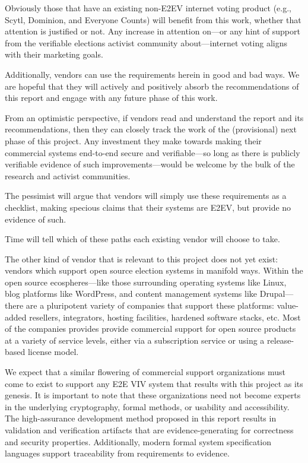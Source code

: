 Obviously those that have an existing non-E2EV internet voting product
(e.g., Scytl, Dominion, and Everyone Counts) will benefit from this
work, whether that attention is justified or not. Any increase in
attention on---or any hint of support from the verifiable elections
activist community about---internet voting aligns with their marketing
goals.

Additionally, vendors can use the requirements herein in good and bad
ways. We are hopeful that they will actively and positively absorb the
recommendations of this report and engage with any future phase of
this work.

From an optimistic perspective, if vendors read and understand the
report and its recommendations, then they can closely track the work
of the (provisional) next phase of this project. Any investment they
make towards making their commercial systems end-to-end secure and
verifiable---so long as there is publicly verifiable evidence of such
improvements---would be welcome by the bulk of the research and
activist communities.

The pessimist will argue that vendors will simply use these
requirements as a checklist, making specious claims that their systems
are E2EV, but provide no evidence of such.

Time will tell which of these paths each existing vendor will choose
to take.

The other kind of vendor that is relevant to this project does not yet
exist: vendors which support open source election systems in manifold
ways. Within the open source ecospheres---like those surrounding
operating systems like Linux, blog platforms like WordPress, and
content management systems like Drupal---there are a pluripotent
variety of companies that support these platforms: value-added
resellers, integrators, hosting facilities, hardened software stacks,
etc. Most of the companies provides provide commercial support for
open source products at a variety of service levels, either via a
subscription service or using a release-based license model.

We expect that a similar flowering of commercial support organizations
must come to exist to support any E2E VIV system that results with
this project as its genesis. It is important to note that these
organizations need not become experts in the underlying cryptography,
formal methods, or usability and accessibility. The high-assurance
development method proposed in this report results in validation and
verification artifacts that are evidence-generating for correctness
and security properties.  Additionally, modern formal system
specification languages support traceability from requirements to
evidence. 

